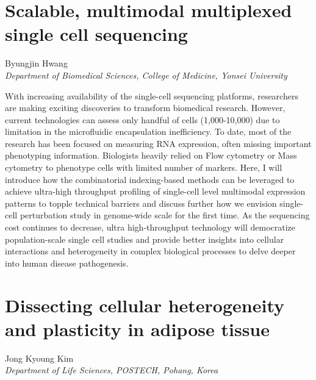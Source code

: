 \section*{Scalable, multimodal multiplexed single cell sequencing}

\begin{center}
Byungjin Hwang \\
\vspace{0.2cm}
\textit{Department of Biomedical Sciences, College of Medicine, Yonsei University} \\
\end{center}

\noindent
With increasing availability of the single-cell sequencing platforms, researchers are making exciting discoveries to transform biomedical research. However, current technologies can assess only handful of cells (1,000-10,000) due to limitation in the microfluidic encapsulation inefficiency. To date, most of the research has been focused on measuring RNA expression, often missing important phenotyping information. Biologists heavily relied on Flow cytometry or Mass cytometry to phenotype cells with limited number of markers. Here, I will introduce how the combinatorial indexing-based methods can be leveraged to achieve ultra-high throughput profiling of single-cell level multimodal expression patterns to topple technical barriers and discuss further how we envision single-cell perturbation study in genome-wide scale for the first time. As the sequencing cost continues to decrease, ultra high-throughput technology will democratize population-scale single cell studies and provide better insights into cellular interactions and heterogeneity in complex biological processes to delve deeper into human disease pathogenesis.
\newpage

\section*{Dissecting cellular heterogeneity and plasticity in adipose tissue}

\begin{center}
Jong Kyoung Kim \\
\vspace{0.2cm}
\textit{Department of Life Sciences, POSTECH, Pohang, Korea} \\
\end{center}

